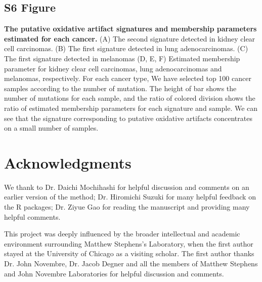 \documentclass[10pt,letterpaper]{article}
\begin{document}
\subsection*{S6 Figure}
\label{oxidation}
{\bf The putative oxidative artifact signatures and membership parameters estimated for each cancer.}
(A) The second signature detected in kidney clear cell carcinomas.
(B) The first signature detected in lung adenocarcinomas.
(C) The first signature detected in melanomas
(D, E, F) Estimated membership parameter for kidney clear cell carcinomas, lung adenocarcinomas and melanomas, respectively.
For each cancer type, 
We have selected top 100 cancer samples according to the number of mutation.
The height of bar shows the number of mutations for each sample,
and the ratio of colored division shows the ratio of estimated membership parameters for each signature and sample.
We can see that the signature corresponding to putative oxidative artifacts concentrates on a small number of samples.

\section*{Acknowledgments}

We thank to Dr. Daichi Mochihashi for helpful discussion and comments on an earlier version of the method;
Dr. Hiromichi Suzuki for many helpful feedback on the R packages;
Dr. Ziyue Gao for reading the manuscript and providing many helpful comments.

This project was deeply influenced by the broader intellectual and academic environment surrounding Matthew Stephens's Laboratory,
when the first author stayed at the University of Chicago as a visiting scholar. The first author thanks Dr. John Novembre,
Dr. Jacob Degner and all the members of Matthew Stephens and John Novembre Laboratories for helpful discussion and comments.


\nolinenumbers


%
%
% 

% 


\end{document}

